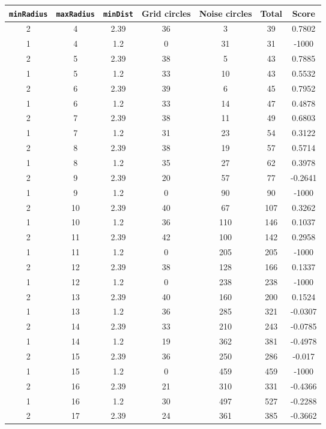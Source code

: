 \documentclass[letterpaper, 12pt]{article}
\begin{document}
\begin{longtable}{|c|c|c|c|c|c|c|}
\hline
\textbf{\texttt{minRadius}} & \textbf{\texttt{maxRadius}} & \textbf{\texttt{minDist}} & \textbf{Grid circles} & \textbf{Noise circles} & \textbf{Total} & \textbf{Score} \\
\hline
2 & 4 & 2.39 & 36 & 3 & 39 & 0.7802 \\
\hline
1 & 4 & 1.2 & 0 & 31 & 31 & -1000 \\
\hline
2 & 5 & 2.39 & 38 & 5 & 43 & 0.7885 \\
\hline
1 & 5 & 1.2 & 33 & 10 & 43 & 0.5532 \\
\hline
2 & 6 & 2.39 & 39 & 6 & 45 & 0.7952 \\
\hline
1 & 6 & 1.2 & 33 & 14 & 47 & 0.4878 \\
\hline
2 & 7 & 2.39 & 38 & 11 & 49 & 0.6803 \\
\hline
1 & 7 & 1.2 & 31 & 23 & 54 & 0.3122 \\
\hline
2 & 8 & 2.39 & 38 & 19 & 57 & 0.5714 \\
\hline
1 & 8 & 1.2 & 35 & 27 & 62 & 0.3978 \\
\hline
2 & 9 & 2.39 & 20 & 57 & 77 & -0.2641 \\
\hline
1 & 9 & 1.2 & 0 & 90 & 90 & -1000 \\
\hline
2 & 10 & 2.39 & 40 & 67 & 107 & 0.3262 \\
\hline
1 & 10 & 1.2 & 36 & 110 & 146 & 0.1037 \\
\hline
2 & 11 & 2.39 & 42 & 100 & 142 & 0.2958 \\
\hline
1 & 11 & 1.2 & 0 & 205 & 205 & -1000 \\
\hline
2 & 12 & 2.39 & 38 & 128 & 166 & 0.1337 \\
\hline
1 & 12 & 1.2 & 0 & 238 & 238 & -1000 \\
\hline
2 & 13 & 2.39 & 40 & 160 & 200 & 0.1524 \\
\hline
1 & 13 & 1.2 & 36 & 285 & 321 & -0.0307 \\
\hline
2 & 14 & 2.39 & 33 & 210 & 243 & -0.0785 \\
\hline
1 & 14 & 1.2 & 19 & 362 & 381 & -0.4978 \\
\hline
2 & 15 & 2.39 & 36 & 250 & 286 & -0.017 \\
\hline
1 & 15 & 1.2 & 0 & 459 & 459 & -1000 \\
\hline
2 & 16 & 2.39 & 21 & 310 & 331 & -0.4366 \\
\hline
1 & 16 & 1.2 & 30 & 497 & 527 & -0.2288 \\
\hline
2 & 17 & 2.39 & 24 & 361 & 385 & -0.3662 \\

\end{longtable}
\end{document}
